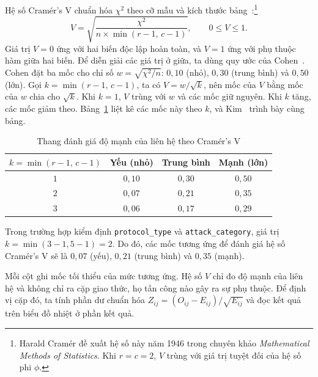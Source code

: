 Hệ số Cramér's V chuẩn hóa $\chi^2$ theo cỡ mẫu và kích thước bảng~\cite{task34_cramer1946}:\footnote{Harald Cramér đề xuất hệ số này năm 1946 trong chuyên khảo \textit{Mathematical Methods of Statistics}. Khi $r = c = 2$, $V$ trùng với giá trị tuyệt đối của hệ số phi $\phi$.}
\begin{equation}
  \label{eq:t34:cramers-v}
  V = \sqrt{\frac{\chi^2}{n \times \min(r - 1,\, c - 1)}}, \qquad 0 \leq V \leq 1.
\end{equation}
Giá trị $V = 0$ ứng với hai biến độc lập hoàn toàn, và $V = 1$ ứng với phụ thuộc hàm giữa hai biến. Để diễn giải các giá trị ở giữa, ta dùng quy ước của Cohen~\cite{task34_cohen1988}. Cohen đặt ba mốc cho chỉ số $w = \sqrt{\chi^2/n}$: $0{,}10$ (nhỏ), $0{,}30$ (trung bình) và $0{,}50$ (lớn). Gọi $k = \min(r - 1,\, c - 1)$, ta có $V = w/\sqrt{k}$, nên mốc của $V$ bằng mốc của $w$ chia cho $\sqrt{k}$. Khi $k = 1$, $V$ trùng với $w$ và các mốc giữ nguyên. Khi $k$ tăng, các mốc giảm theo. Bảng~\ref{tab:t34:cramer-scale} liệt kê các mốc này theo $k$, và Kim~\cite{task34_kim2017} trình bày cùng bảng.

\begin{table}[H]
  \centering
  \caption{Thang đánh giá độ mạnh của liên hệ theo Cramér's V\cite{task34_kim2017}}
  \label{tab:t34:cramer-scale}
  \begin{tabular}{cccc}
    \toprule
    $k = \min(r-1,\, c-1)$ & Yếu (nhỏ) & Trung bình & Mạnh (lớn) \\
    \midrule
    $1$ & $0{,}10$ & $0{,}30$ & $0{,}50$ \\
    $2$ & $0{,}07$ & $0{,}21$ & $0{,}35$ \\
    $3$ & $0{,}06$ & $0{,}17$ & $0{,}29$ \\
    \bottomrule
  \end{tabular}
\end{table}
\noindent Trong trường hợp kiểm định \texttt{protocol\_type} và \texttt{attack\_category}, giá trị $k = \min(3-1, 5-1) = 2$. Do đó, các mốc tương ứng để đánh giá hệ số Cramér's V sẽ là $0{,}07$ (yếu), $0{,}21$ (trung bình) và $0{,}35$ (mạnh).

Mỗi cột ghi mốc tối thiểu của mức tương ứng. Hệ số $V$ chỉ đo độ mạnh của liên hệ và không chỉ ra cặp giao thức, họ tấn công nào gây ra sự phụ thuộc. Để định vị cặp đó, ta tính phần dư chuẩn hóa $Z_{ij} = (O_{ij} - E_{ij})/\sqrt{E_{ij}}$ và đọc kết quả trên biểu đồ nhiệt ở phần kết quả.
